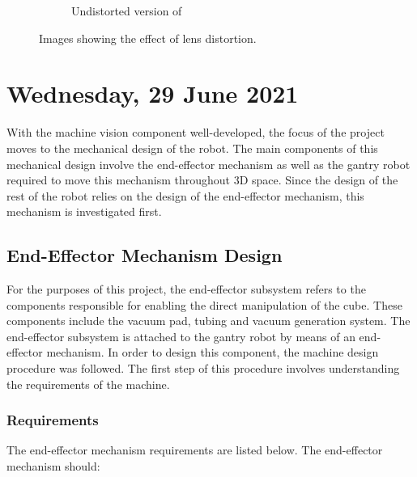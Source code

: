 \begin{figure}[H]
\begin{subfigure}[b]{0.45\textwidth}
        \caption{Undistorted version of }
        \label{fig:undistorted-checkerboard}
    \end{subfigure}
    \captionsetup{singlelinecheck = false, justification=justified}
    \caption{Images showing the effect of lens distortion.}
    \label{fig:checkerboard-distortion}
\end{figure}


\pendsign

\section[2021/06/29]{Wednesday, 29 June 2021}

With the machine vision component well-developed, the focus of the project moves to the mechanical design of the robot. The main components of this mechanical design involve the end-effector mechanism as well as the gantry robot required to move this mechanism throughout 3D space. Since the design of the rest of the robot relies on the design of the end-effector mechanism, this mechanism is investigated first.

\subsection{End-Effector Mechanism Design}

For the purposes of this project, the end-effector subsystem refers to the components responsible for enabling the direct manipulation of the cube. These components include the vacuum pad, tubing and vacuum generation system. The end-effector subsystem is attached to the gantry robot by means of an end-effector mechanism. In order to design this component, the machine design procedure was followed. The first step of this procedure involves understanding the requirements of the machine.

\subsubsection{Requirements}

The end-effector mechanism requirements are listed below. The end-effector mechanism should:

